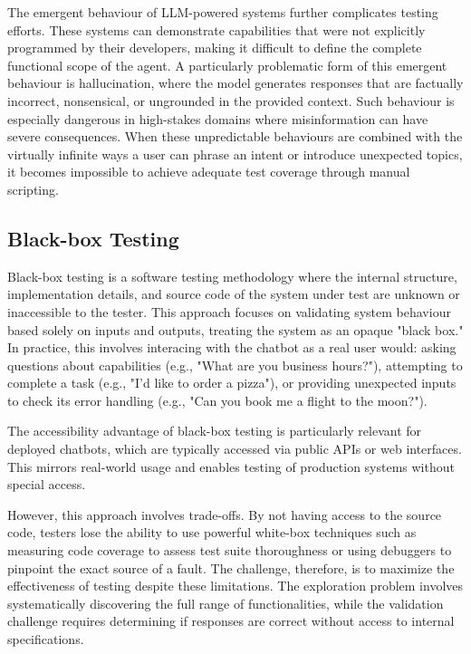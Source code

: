 The emergent behaviour of \ac{LLM}-powered systems further complicates testing efforts.
These systems can demonstrate capabilities
that were not explicitly programmed by their developers,
making it difficult to define the complete functional scope of the agent.
A particularly problematic form of this emergent behaviour is hallucination,
where the model generates responses that are
factually incorrect, nonsensical, or ungrounded in the provided context.
Such behaviour is especially dangerous in high-stakes domains
where misinformation can have severe consequences.
When these unpredictable behaviours are combined
with the virtually infinite ways a user can
phrase an intent or introduce unexpected topics,
it becomes impossible to achieve adequate test coverage through manual scripting.

\subsection{Black-box Testing}

Black-box testing is a software testing methodology
where the internal structure, implementation details, and source code of the system under test
are unknown or inaccessible to the tester.
This approach focuses on validating system behaviour based solely on inputs and outputs,
treating the system as an opaque "black box."
In practice, this involves interacing with the chatbot as a real user would:
asking questions about capabilities
(e.g., "What are you business hours?"),
attempting to complete a task
(e.g., "I'd like to order a pizza"),
or providing unexpected inputs to check its error handling
(e.g., "Can you book me a flight to the moon?").

The accessibility advantage of black-box testing
is particularly relevant for deployed chatbots,
which are typically accessed via public \acp{API} or web interfaces.
This mirrors real-world usage
and enables testing of production systems without special access.


However, this approach involves trade-offs.
By not having access to the source code,
testers lose the ability to use powerful white-box techniques
such as measuring code coverage to assess test suite thoroughness
or using debuggers to pinpoint the exact source of a fault.
The challenge, therefore, is
to maximize the effectiveness of testing
despite these limitations.
The exploration problem involves
systematically discovering the full range of functionalities,
while the validation challenge requires
determining if responses are correct
without access to internal specifications.

